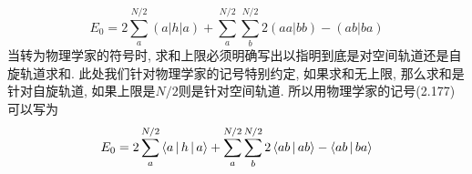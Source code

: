 \begin{equation}
E_0 = 2 \sum_{a}^{N/2}({a|h|a}) + \sum_{a}^{N/2}\sum_{b}^{N/2}2({aa|bb}) - ({ab|ba})
\end{equation}
当转为物理学家的符号时, 求和上限必须明确写出以指明到底是对空间轨道还是自旋轨道求和. 此处我们针对物理学家的记号特别约定, 如果求和无上限, 那么求和是针对自旋轨道, 如果上限是$N/2$则是针对空间轨道. 所以用物理学家的记号(2.177)可以写为
\begin{equation}
E_0 = 2 \sum_{a}^{N/2}\Braket{a|h|a} + \sum_{a}^{N/2}\sum_{b}^{N/2}2\Braket{ab|ab} - \Braket{ab|ba}
\end{equation}
